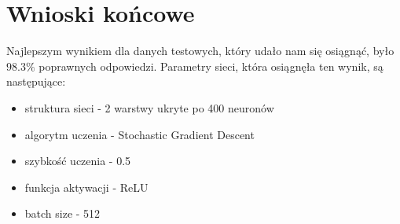 \chapter{Wnioski końcowe}
Najlepszym wynikiem dla danych testowych, który udało nam się osiągnąć, było $\num{98,3}\%$ poprawnych odpowiedzi. Parametry sieci, która osiągnęła ten wynik, są następujące:
\begin{itemize}
\item struktura sieci - 2 warstwy ukryte po 400 neuronów
\item algorytm uczenia - Stochastic Gradient Descent
\item szybkość uczenia - \num{0,5}
\item funkcja aktywacji - ReLU
\item batch size - 512
\end{itemize}